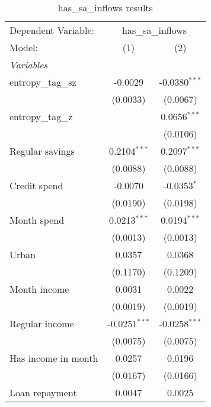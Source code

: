 
\begin{table}[htbp]
   \centering
   \footnotesize
   \begin{threeparttable}[b]
      \caption{\label{tab:reg_has_sa_inflows_full.tex} has\_sa\_inflows results}
      \begin{tabular}{lcc}
         \tabularnewline \midrule \midrule
         Dependent Variable: & \multicolumn{2}{c}{has\_sa\_inflows}\\
         Model:              & (1)             & (2)\\  
         \midrule
         \emph{Variables}\\
         entropy\_tag\_sz    & -0.0029         & -0.0380$^{***}$\\   
                             & (0.0033)        & (0.0067)\\   
         entropy\_tag\_z     &                 & 0.0656$^{***}$\\   
                             &                 & (0.0106)\\   
         Regular savings     & 0.2104$^{***}$  & 0.2097$^{***}$\\   
                             & (0.0088)        & (0.0088)\\   
         Credit spend        & -0.0070         & -0.0353$^{*}$\\   
                             & (0.0190)        & (0.0198)\\   
         Month spend         & 0.0213$^{***}$  & 0.0194$^{***}$\\   
                             & (0.0013)        & (0.0013)\\   
         Urban               & 0.0357          & 0.0368\\   
                             & (0.1170)        & (0.1209)\\   
         Month income        & 0.0031          & 0.0022\\   
                             & (0.0019)        & (0.0019)\\   
         Regular income      & -0.0251$^{***}$ & -0.0258$^{***}$\\   
                             & (0.0075)        & (0.0075)\\   
         Has income in month & 0.0257          & 0.0196\\   
                             & (0.0167)        & (0.0166)\\   
         Loan repayment      & 0.0047          & 0.0025\\   

\end{tabular}
\end{threeparttable}
\end{table}
